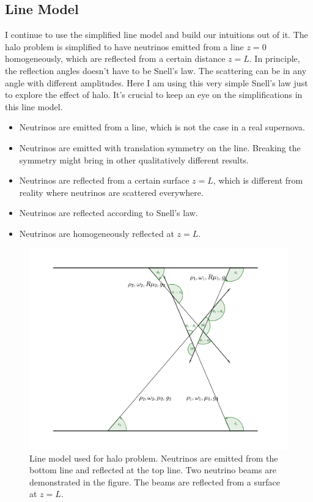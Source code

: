 \subsection{\label{chap:halo-sec:line}Line Model}

I continue to use the simplified line model and build our intuitions out of it. The halo problem is simplified to have neutrinos emitted from a line $z=0$ homogeneously, which are reflected from a certain distance $z=L$. In principle, the reflection angles doesn’t have to be Snell’s law. The scattering can be in any angle with different amplitudes. Here I am using this very simple Snell’s law just to explore the effect of halo. It's crucial to keep an eye on the simplifications in this line model.
\begin{itemize}
    \item Neutrinos are emitted from a line, which is not the case in a real supernova.
    \item Neutrinos are emitted with translation symmetry on the line. Breaking the symmetry might bring in other qualitatively different results.
    \item Neutrinos are reflected from a certain surface $z=L$, which is different from reality where neutrinos are scattered everywhere.
    \item Neutrinos are reflected according to Snell's law.
    \item Neutrinos are homogeneously reflected at $z=L$.
\end{itemize}



\begin{figure}
    \centering
    \includegraphics[width=\textwidth]{chapters/assets/halo/halo-line-model}
    \caption{Line model used for halo problem. Neutrinos are emitted from the bottom line and reflected at the top line. Two neutrino beams are demonstrated in the figure. The beams are reflected from a surface at $z=L$.}
    \label{chap:halo-sec:line-fig:line-model}
\end{figure}


